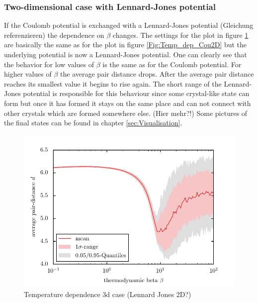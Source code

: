 \documentclass[11pt, a4paper]{article}
\numberwithin{equation}{section}
\newcommand{\remark}[1]{{\color{red}(#1)}}
\begin{document}
\subsubsection{Two-dimensional case with Lennard-Jones potential}
If the Coulomb potential is exchanged with a Lennard-Jones potential \remark{Gleichung referenzieren} the dependence on $\beta$ changes.
The settings for the plot in figure \ref{Fig:Temp_dep_LJ2D} are basically the same as for the plot in figure \ref{Fig:Temp_dep_Cou2D} but the underlying potential is now a Lennard-Jones potential.
One can clearly see that the behavior for low values of $\beta$ is the same as for the Coulomb potential.
For higher values of $\beta$ the average pair distance drops.
After the average pair distance reaches its smallest value it begins to rise again.
The short range of the Lennard-Jones potential is responsible for this behaviour since some crystal-like state can form but once it has formed it stays on the same place and can not connect with other crystals which are formed somewhere else. \remark{Hier mehr?!}
Some pictures of the final states can be found in chapter \ref{sec:Visualisation}.

\begin{figure}
	\centering
	\includegraphics{./figures/temp_dep_lennard_jones2d.pdf}
	\caption{Temperature dependence 3d case \remark{Lennard Jones 2D?}}
	\label{Fig:Temp_dep_LJ2D}
\end{figure}
\end{document}
